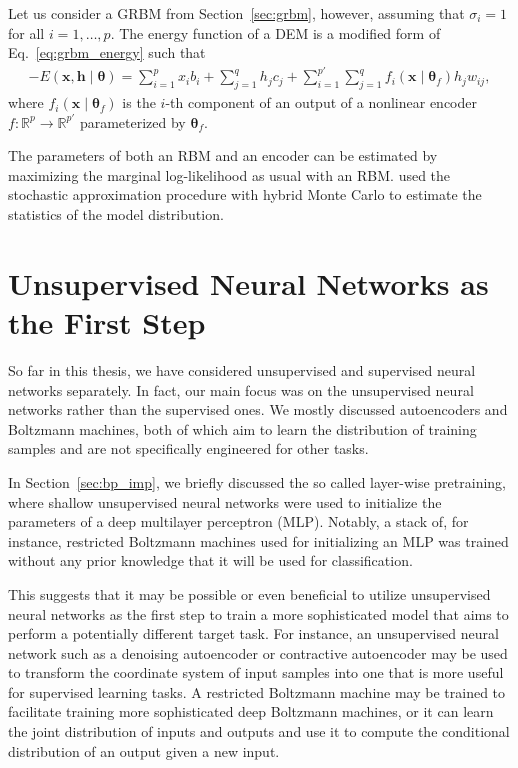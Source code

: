 \documentclass[dissertation,nocontribution]{aaltoseries}
\newcommand{\vect}[1]{\mathbf{#1}}
\newcommand{\vects}[1]{\boldsymbol{#1}}
\newcommand{\vh}[0]{\vect{h}}
\newcommand{\vx}[0]{\vect{x}}
\newcommand{\TT}[0]{{\vects{\theta}}}
\newcommand{\RR}[0]{\mathbb{R}}
\begin{document}
Let us consider a GRBM from Section~\ref{sec:grbm}, however,
assuming that $\sigma_i=1$ for all $i=1,\dots,p$. The energy
function of a DEM is a modified form of
Eq.~\eqref{eq:grbm_energy} such that
\begin{align*}
    \label{eq:dem_energy}
    -E(\vx, \vh \mid \TT) = \sum_{i=1}^p x_i b_i
    + \sum_{j=1}^q h_j c_j +
    \sum_{i=1}^{p'} \sum_{j=1}^q f_i(\vx\mid \TT_f) h_j
    w_{ij},
\end{align*}
where $f_i(\vx \mid \TT_f)$ is the $i$-th component of an
output of a nonlinear encoder $f:\RR^p \to \RR^{p'}$
parameterized by $\TT_f$.

The parameters of both an RBM and an encoder can be
estimated by maximizing the marginal log-likelihood as usual
with an RBM. \citet{Ngiam2011} used the stochastic
approximation procedure with hybrid Monte Carlo
\citep{Neal1993} to estimate the statistics of the model
distribution.


\chapter{Unsupervised Neural Networks as the First Step}
\label{chap:pretraining}

So far in this thesis, we have considered unsupervised
and supervised neural networks separately.  In fact, our
main focus was on the unsupervised neural networks rather
than the supervised ones. We mostly discussed
autoencoders and Boltzmann machines, both of which aim to
learn the distribution of training samples and are not
specifically engineered for other tasks.

In Section~\ref{sec:bp_imp}, we briefly discussed the so
called layer-wise pretraining, where shallow
unsupervised neural networks were used to initialize the
parameters of a deep multilayer perceptron (MLP). Notably,
a stack of, for instance, restricted Boltzmann machines used
for initializing an MLP was trained without any prior
knowledge that it will be used for classification.

This suggests that it may be possible or even beneficial
to utilize unsupervised neural networks as the first step to
train a more sophisticated model that aims to perform a
potentially different target task. For instance, an
unsupervised neural network such as a denoising autoencoder
or contractive autoencoder may be used to transform the
coordinate system of input samples into one that is more
useful for supervised learning tasks. A restricted Boltzmann machine
may be trained to facilitate training more sophisticated
deep Boltzmann machines, or it can learn the joint
distribution of inputs and outputs and use it to compute the
conditional distribution of an output given a new input.
\end{document}
